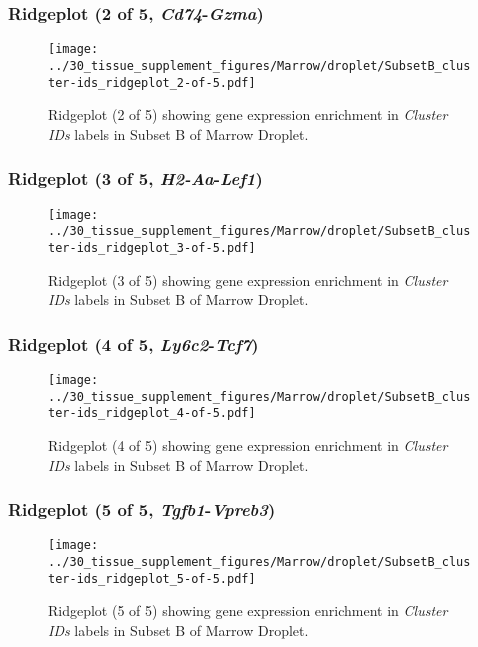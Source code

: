 \subsubsection{Ridgeplot (2 of 5, \emph{Cd74}-\emph{Gzma})}
\begin{figure}[h]
\centering
\texttt{[image: ../30\_tissue\_supplement\_figures/Marrow/droplet/SubsetB\_cluster-ids\_ridgeplot\_2-of-5.pdf]}

\caption{ Ridgeplot (2 of 5)  showing gene expression enrichment in \emph{Cluster IDs} labels in Subset B of Marrow Droplet. }
\end{figure}


\clearpage

\subsubsection{Ridgeplot (3 of 5, \emph{H2-Aa}-\emph{Lef1})}
\begin{figure}[h]
\centering
\texttt{[image: ../30\_tissue\_supplement\_figures/Marrow/droplet/SubsetB\_cluster-ids\_ridgeplot\_3-of-5.pdf]}

\caption{ Ridgeplot (3 of 5)  showing gene expression enrichment in \emph{Cluster IDs} labels in Subset B of Marrow Droplet. }
\end{figure}


\clearpage

\subsubsection{Ridgeplot (4 of 5, \emph{Ly6c2}-\emph{Tcf7})}
\begin{figure}[h]
\centering
\texttt{[image: ../30\_tissue\_supplement\_figures/Marrow/droplet/SubsetB\_cluster-ids\_ridgeplot\_4-of-5.pdf]}

\caption{ Ridgeplot (4 of 5)  showing gene expression enrichment in \emph{Cluster IDs} labels in Subset B of Marrow Droplet. }
\end{figure}


\clearpage

\subsubsection{Ridgeplot (5 of 5, \emph{Tgfb1}-\emph{Vpreb3})}
\begin{figure}[h]
\centering
\texttt{[image: ../30\_tissue\_supplement\_figures/Marrow/droplet/SubsetB\_cluster-ids\_ridgeplot\_5-of-5.pdf]}

\caption{ Ridgeplot (5 of 5)  showing gene expression enrichment in \emph{Cluster IDs} labels in Subset B of Marrow Droplet. }
\end{figure}


